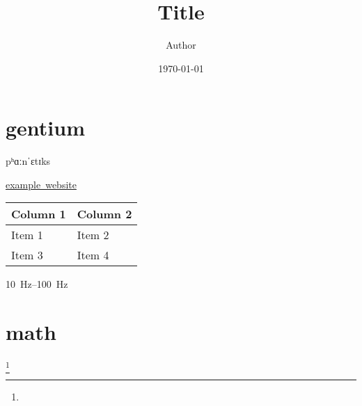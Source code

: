 \documentclass[twoside, 12pt]{article}
\title{Title}
\author{Author}
\date{\today}
\begin{document}
    \maketitle
    \tableofcontents
    \newpage

    \section{gentium}
    \label{sec1}
    {\gentium pʰɑːnˈɛtɪks}
    
    \href{www.example.com}{example\ website}

    \begin{tabu} to .8\textwidth {X[2,l]X[1,r]}
        Column 1 & Column 2 \\
        \hline
        Item 1 & Item 2 \\
        Item 3 & Item 4 \\
    \end{tabu}

    \SIrange{10}{100}{\hertz}

    \section{math}      \label{sec2}
        \footnote{}
\end{document}
